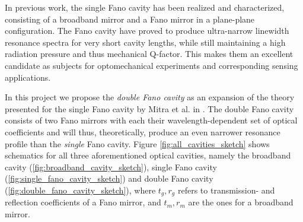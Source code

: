 In previous work, the single Fano cavity has been realized and characterized, consisting of a broadband mirror and a Fano mirror in a plane-plane configuration. The Fano cavity have proved to produce ultra-narrow linewidth resonance spectra for very short cavity lengths, while still maintaining a high radiation pressure and thus mechanical Q-factor. This makes them an excellent candidate as subjects for optomechanical experiments and corresponding sensing applications. 

In this project we propose the \emph{double Fano cavity} as an expansion of the theory presented for the single Fano cavity by Mitra et al. in \cite{Mitra}. The double Fano cavity consists of two Fano mirrors with each their wavelength-dependent set of optical coefficients and will thus, theoretically, produce an even narrower resonance profile than the \emph{single} Fano cavity. Figure \ref{fig:all_cavities_sketch} shows schematics for all three aforementioned optical cavities, namely the broadband cavity (\ref{fig:broadband_cavity_sketch}), single Fano cavity (\ref{fig:single_fano_cavity_sketch}) and double Fano cavity (\ref{fig:double_fano_cavity_sketch}), where $t_g, r_g$ refers to transmission- and reflection coefficients of a Fano mirror, and $t_m, r_m$ are the ones for a broadband mirror.

